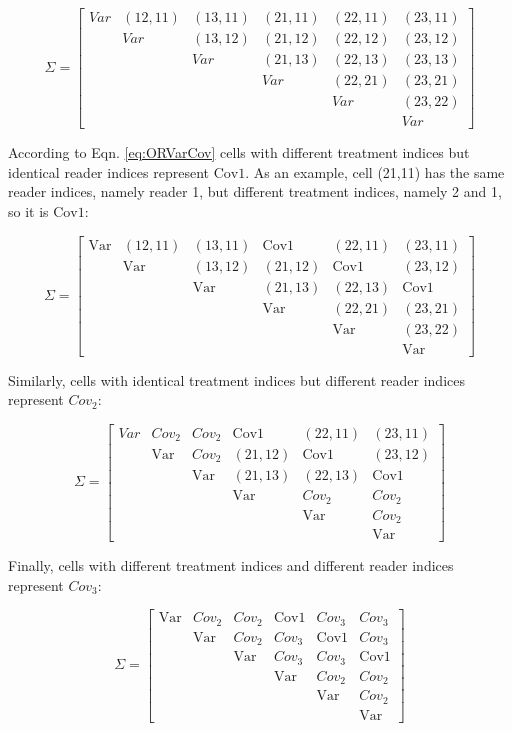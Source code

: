 \documentclass[
]{book}
\begin{document}
\[
\Sigma=
\begin{bmatrix}
Var & (12,11) & (13,11) & (21,11) & (22,11) & (23,11) \\
& Var & (13,12) & (21,12) & (22,12) & (23,12) \\ 
& & Var & (21,13) & (22,13) & (23,13) \\ 
& & & Var & (22,21) & (23,21) \\
& & & & Var & (23,22) \\ 
& & & & & Var
\end{bmatrix}
\]

According to Eqn. \eqref{eq:ORVarCov} cells with different treatment indices but identical reader indices represent \(\text{Cov1}\). As an example, cell (21,11) has the same reader indices, namely reader 1, but different treatment indices, namely 2 and 1, so it is \(\text{Cov1}\):

\[
\Sigma=
\begin{bmatrix}
\text{Var} & (12,11) & (13,11) & \text{Cov1} & (22,11) & (23,11) \\
& \text{Var} & (13,12) & (21,12) & \text{Cov1} & (23,12) \\ 
& & \text{Var} & (21,13) & (22,13) & \text{Cov1} \\ 
& & & \text{Var} & (22,21) & (23,21) \\
& & & & \text{Var} & (23,22) \\ 
& & & & & \text{Var}
\end{bmatrix}
\]

Similarly, cells with identical treatment indices but different reader indices represent \(Cov_2\):

\[
\Sigma=
\begin{bmatrix}
Var & Cov_2 & Cov_2 & \text{Cov1} & (22,11) & (23,11) \\
& \text{Var} & Cov_2 & (21,12) & \text{Cov1} & (23,12) \\ 
&  & \text{Var} & (21,13) & (22,13) & \text{Cov1} \\ 
&  &  & \text{Var} & Cov_2 & Cov_2 \\
&  &  &  & \text{Var} & Cov_2 \\ 
&  &  &  &  & \text{Var}
\end{bmatrix}
\]

Finally, cells with different treatment indices and different reader indices represent \(Cov_3\):

\[
\Sigma=
\begin{bmatrix}
\text{Var} & Cov_2 & Cov_2 & \text{Cov1} & Cov_3 & Cov_3 \\
& \text{Var} & Cov_2 & Cov_3 & \text{Cov1} & Cov_3 \\ 
&  & \text{Var} & Cov_3 & Cov_3 & \text{Cov1} \\ 
&  &  & \text{Var} & Cov_2 & Cov_2 \\
&  &  &  & \text{Var} & Cov_2 \\ 
&  &  &  &  & \text{Var}
\end{bmatrix}
\]
\end{document}
